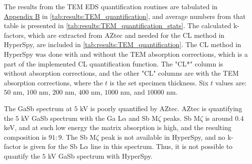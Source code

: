 The results from the TEM EDS quantification routines are tabulated in \hyperref[appendix:tables]{Appendix B} in \cref{tab:results:TEM_quantification}, and average numbers from that table is presented in \cref{tab:results:TEM_quantification_stats}.
The calculated k-factors, which are extracted from AZtec and needed for the CL method in HyperSpy, are included in \cref{tab:results:TEM_quantification}.
The CL method in HyperSpy was done with and without the TEM absorption corrections, which is a part of the implemented CL quantification function.
The "CL*" column is without absorption corrections, and the other "CL" columns are with the TEM absorption corrections, where the $t$ is the set specimen thickness.
Six $t$ values are: $50$ nm, $100$ nm, $200$ nm, $400$ nm, $1000$ nm, and $10000$ nm.


The GaSb spectrum at $5$ kV is poorly quantified by AZtec.
AZtec is quantifying the $5$ kV GaSb spectrum with the Ga L$\alpha$ and Sb M$\zeta$ peaks.
Sb M$\zeta$ is around $0.4$ keV, and at such low energy the matrix absorption is high, and the resulting composition is $91:9$.
The Sb M$\zeta$ peak is not available in HyperSpy, and no k-factor is given for the Sb L$\alpha$ line in this spectrum.
Thus, it is not possible to quantify the $5$ kV GaSb spectrum with HyperSpy.


